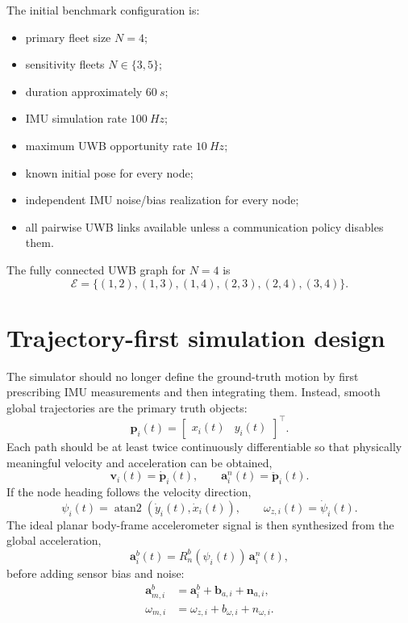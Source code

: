 The initial benchmark configuration is:
\begin{itemize}
    \item primary fleet size \(N=4\);
    \item sensitivity fleets \(N\in\{3,5\}\);
    \item duration approximately \(\SI{60}{s}\);
    \item IMU simulation rate \(\SI{100}{Hz}\);
    \item maximum UWB opportunity rate \(\SI{10}{Hz}\);
    \item known initial pose for every node;
    \item independent IMU noise/bias realization for every node;
    \item all pairwise UWB links available unless a communication policy disables them.
\end{itemize}

The fully connected UWB graph for \(N=4\) is
\begin{equation}
    \mathcal{E}
    =
    \{(1,2),(1,3),(1,4),(2,3),(2,4),(3,4)\}.
\end{equation}

\section{Trajectory-first simulation design}
The simulator should no longer define the ground-truth motion by first prescribing IMU measurements and then integrating them. Instead, smooth global trajectories are the primary truth objects:
\begin{equation}
    \bm{p}_i(t)
    =
    \begin{bmatrix}
        x_i(t) & y_i(t)
    \end{bmatrix}^{\top}.
\end{equation}
Each path should be at least twice continuously differentiable so that physically meaningful velocity and acceleration can be obtained,
\begin{equation}
    \bm{v}_i(t)=\dot{\bm{p}}_i(t),
    \qquad
    \bm{a}_i^n(t)=\ddot{\bm{p}}_i(t).
\end{equation}
If the node heading follows the velocity direction,
\begin{equation}
    \psi_i(t)=\operatorname{atan2}(\dot y_i(t),\dot x_i(t)),
    \qquad
    \omega_{z,i}(t)=\dot\psi_i(t).
\end{equation}
The ideal planar body-frame accelerometer signal is then synthesized from the global acceleration,
\begin{equation}
    \bm{a}_i^b(t)
    =
    R_n^b(\psi_i(t))\,\bm{a}_i^n(t),
\end{equation}
before adding sensor bias and noise:
\begin{align}
    \bm{a}_{m,i}^b &= \bm{a}_i^b+\bm{b}_{a,i}+\bm{n}_{a,i},\\
    \omega_{m,i} &= \omega_{z,i}+b_{\omega,i}+n_{\omega,i}.
\end{align}

